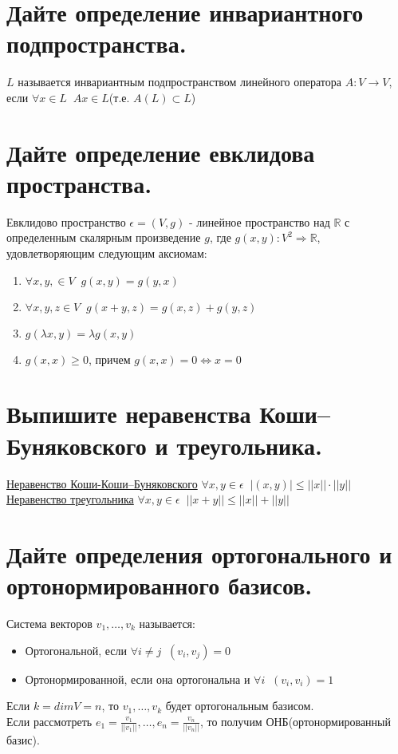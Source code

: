 \documentclass{article}
\newcommand{\R}[0]{
    \mathbb{R}
}
\begin{document}
\section{Дайте определение инвариантного подпространства.}
$L$ называется инвариантным подпространством линейного оператора
$A: V \longrightarrow V$, если $\forall x \in L \;\; Ax \in L$(т.е. $A(L) \subset L$)

\section{Дайте определение евклидова пространства.}
Евклидово пространство $\epsilon = (V, g)$ - линейное пространство над $\R$ с определенным скалярным произведение $g$,
где $g(x, y): V^2 \Longrightarrow \R$, удовлетворяющим следующим аксиомам:
\begin{enumerate}
    \item $\forall x, y, \in V \;\; g(x, y) = g(y, x)$
    \item $\forall x, y, z \in V \;\; g(x + y, z) = g(x, z) + g(y, z)$
    \item $g(\lambda x, y) = \lambda g(x, y)$
    \item $g(x, x) \geq 0$, причем $g(x, x) = 0 \iff x = 0$
\end{enumerate}

\section{Выпишите неравенства Коши–Буняковского и треугольника.}
\underline{Неравенство Коши-Коши–Буняковского} $\forall x, y \in \epsilon \;\; |(x, y)| \leq ||x|| \cdot ||y||$
\\
\underline{Неравенство треугольника} $\forall x, y \in \epsilon \;\; ||x + y|| \leq ||x|| + ||y||$

\section{Дайте определения ортогонального и ортонормированного базисов.}
Система векторов $v_1, \ldots, v_k$ называется:
\begin{itemize}
    \item Ортогональной, если $\forall i \neq j \;\; (v_i, v_j) = 0$
    \item Ортонормированной, если она ортогональна и $\forall i \;\; (v_i, v_i) = 1$
\end{itemize}
Если $k = dim V = n$, то $v_1, \ldots, v_k$ будет ортогональным базисом.
\\
Если рассмотреть $e_1 = \frac{v_1}{||v_1||}, \ldots, e_n = \frac{v_n}{||v_n||}$, то
получим ОНБ(ортонормированный базис).
\end{document}
